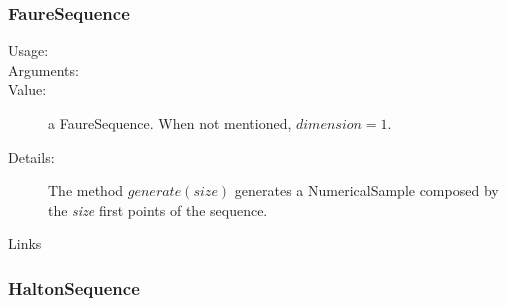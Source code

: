 \subsubsection{FaureSequence}

\begin{description}

\item[Usage:] \rule{0pt}{1em}

\item[Arguments:]  \rule{0pt}{1em}

\item[Value:] a FaureSequence. When not mentioned, $dimension=1$.

\item[Details:]  The method $generate(size)$ generates a NumericalSample composed by the \textit{size} first points of the sequence.


\item[Links] \rule{0pt}{1em}
\end{description}




\newpage
\subsubsection{HaltonSequence}

